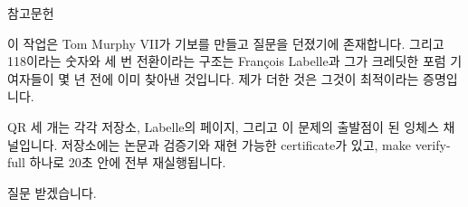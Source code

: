 \documentclass[aspectratio=169,10pt]{beamer}
\begin{document}
\begin{frame}{참고문헌}
{  이 작업은 Tom Murphy VII가 기보를 만들고 질문을 던졌기에 존재합니다. 그리고
  118이라는 숫자와 세 번 전환이라는 구조는 François Labelle과 그가 크레딧한
  포럼 기여자들이 몇 년 전에 이미 찾아낸 것입니다. 제가 더한 것은 그것이
  최적이라는 증명입니다.

  QR 세 개는 각각 저장소, Labelle의 페이지, 그리고 이 문제의 출발점이 된
  잉체스 채널입니다. 저장소에는 논문과 검증기와 재현 가능한 certificate가
  있고, make verify-full 하나로 20초 안에 전부 재실행됩니다.

  질문 받겠습니다.}
\end{frame}
\end{document}
